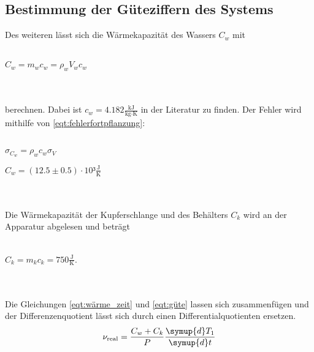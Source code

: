 \subsection{Bestimmung der Güteziffern des Systems}

Des weiteren lässt sich die Wärmekapazität des Wassers $C_w$ mit
\\ \\
\centerline{$C_w = m_w c_w = \rho_w V_w c_w$}
\\ \\
berechnen. Dabei ist $c_w = 4.182 \frac{\textrm{kJ}}{\textrm{kg$\cdot$K}}$ in der Literatur zu finden. \cite{c-wasser}
Der Fehler wird mithilfe von \eqref{eqt:fehlerfortpflanzung}:
\\ \\
\centerline{$\sigma_\text{$C_w$} = \rho_w c_w \sigma_V$}
\centerline{$C_w = (12.5 \pm 0.5) \cdot 10³ \frac{\textrm{J}}{\textrm{K}}$}
\\ \\
Die Wärmekapazität der Kupferschlange und des Behälters $C_k$ wird an der Apparatur abgelesen und beträgt 
\\ \\
\centerline{$C_k = m_k c_k = 750 \frac{\textrm{J}}{\textrm{K}}$.}
\\ \\
Die Gleichungen \eqref{eqt:wärme_zeit} und \eqref{eqt:güte} lassen sich zusammenfügen und der Differenzenquotient lässt sich durch einen Differentialquotienten ersetzen.
\begin{equation}
  \nu_\text{real} = \frac{C_w + C_k}{P} \frac{\symup{d}T_1}{\symup{d}t}
\end{equation}


